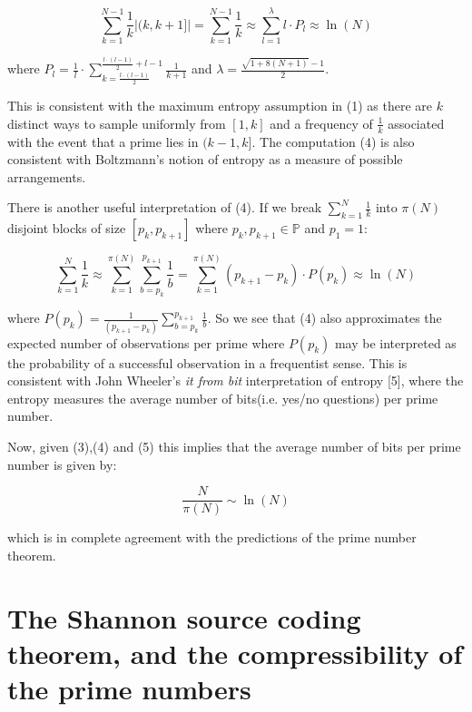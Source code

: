 \documentclass{article}
\begin{document}
\begin{equation}
\sum_{k=1}^{N-1} \frac{1}{k} \lvert (k,k+1] \rvert = \sum_{k=1}^{N-1} \frac{1}{k} \approx \sum_{l=1}^\lambda l \cdot P_l \approx \ln(N) 
\end{equation}

where $P_l = \frac{1}{l} \cdot \sum_{k= \frac{l \cdot (l-1)}{2}}^{\frac{l\cdot (l-1)}{2}+l-1} \frac{1}{k+1}$ and  $\lambda = \frac{\sqrt{1+8(N+1)}-1}{2}$.

This is consistent with the maximum entropy assumption in (1) as there are $k$ distinct ways to sample uniformly from $[1,k]$ and a frequency of $\frac{1}{k}$ associated with the event that a prime lies in $(k-1,k]$. The computation (4) is also consistent with Boltzmann's notion of entropy as a measure of possible arrangements.

There is another useful interpretation of (4). If we break $\sum_{k=1}^{N} \frac{1}{k}$ into $\pi(N)$ disjoint blocks of size $[p_k,p_{k+1}]$ where $p_k,p_{k+1} \in \mathbb{P}$ and $p_1 = 1$:

\begin{equation}
\sum_{k=1}^{N} \frac{1}{k} \approx \sum_{k=1}^{\pi(N)} \sum_{b=p_k}^{p_{k+1}} \frac{1}{b} = \sum_{k=1}^{\pi(N)} (p_{k+1}-p_k)\cdot P(p_k) \approx \ln(N) 
\end{equation}

where $P(p_k)= \frac{1}{(p_{k+1}-p_k)} \sum_{b=p_k}^{p_{k+1}} \frac{1}{b}$. So we see that (4) also approximates the expected number of observations per prime where $P(p_k)$ may be interpreted as the probability of a successful observation in a frequentist sense. This is consistent with John Wheeler's \textit{it from bit} interpretation of entropy [5], where the entropy measures the average number of bits(i.e. yes/no questions) per prime number.

Now, given (3),(4) and (5) this implies that the average number of bits per prime number is given by:

\begin{equation}
\frac{N}{\pi(N)} \sim \ln(N)
\end{equation}

which is in complete agreement with the predictions of the prime number theorem.

\section{The Shannon source coding theorem, and the compressibility of the prime numbers}
\end{document}
